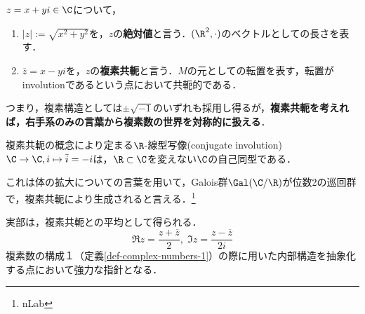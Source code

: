 \documentclass[uplatex, dvipdfmx]{jsreport}
\begin{document}
\begin{definition}
    $z=x+yi\in\C$について，
    \begin{enumerate}
        \item $|z|:=\sqrt{x^2+y^2}$を，$z$の\textbf{絶対値}と言う．$(\R^2,\cdot)$のベクトルとしての長さを表す．
        \item $\overline{z}=x-yi$を，$z$の\textbf{複素共軛}と言う．$M$の元としての転置を表す，転置がinvolutionであるという点において共軛的である．
    \end{enumerate}
    つまり，複素構造としては$\pm\sqrt{-1}$のいずれも採用し得るが，\textbf{複素共軛を考えれば，右手系のみの言葉から複素数の世界を対称的に扱える}．
\end{definition}
\begin{proposition}
    複素共軛の概念により定まる$\R$-線型写像(conjugate involution) $\C\to\C, i\mapsto\overline{i}=-i$は，$\R\subset\C$を変えない$\C$の自己同型である．
\end{proposition}
\begin{remark}
    これは体の拡大についての言葉を用いて，Galois群$\Gal(\C/\R)$が位数2の巡回群で，複素共軛により生成されると言える．\footnote{nLab}
\end{remark}
\begin{proposition}[複素共軛による特徴付け]
    実部は，複素共軛との平均として得られる．
    \[ \Re z=\frac{z+\overline{z}}{2},\; \Im z=\frac{z-\overline{z}}{2i} \]
    複素数の構成１（定義\ref{def-complex-numbers-1}）の際に用いた内部構造を抽象化する点において強力な指針となる．
\end{proposition}
\end{document}
